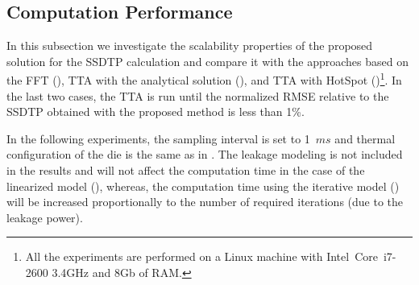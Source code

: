 \subsection{Computation Performance} \label{sec:results-ssdtp}
In this subsection we investigate the scalability properties of the proposed solution for the SSDTP calculation and compare it with the approaches based on the FFT (), TTA with the analytical solution (), and TTA with HotSpot ()\footnote{All the experiments are performed on a Linux machine with Intel\textregistered\ Core\texttrademark\ i7-2600 3.4GHz and 8Gb of RAM.}. In the last two cases, the TTA is run until the normalized RMSE relative to the SSDTP obtained with the proposed method is less than 1\%.

In the following experiments, the sampling interval is set to \mbox{1 $ms$} and thermal configuration of the die is the same as in . The leakage modeling is not included in the results and will not affect the computation time in the case of the linearized model (), whereas, the computation time using the iterative model () will be increased proportionally to the number of required iterations (due to the leakage power).

